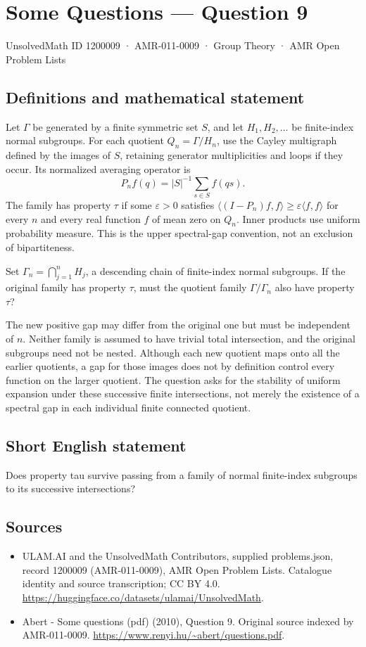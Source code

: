 \documentclass[11pt,a4paper]{article}
\begin{document}
\section*{Some Questions — Question 9}\label{1200009}
{\small UnsolvedMath ID 1200009 · AMR-011-0009 · Group Theory · AMR Open Problem Lists}
\subsection{Definitions and mathematical statement}
Let $\Gamma$ be generated by a finite symmetric set $S$, and let $H_1,H_2,\ldots$ be finite-index normal subgroups. For each quotient $Q_n=\Gamma/H_n$, use the Cayley multigraph defined by the images of $S$, retaining generator multiplicities and loops if they occur. Its normalized averaging operator is
\[
 P_n f(q)=|S|^{-1}\sum_{s\in S}f(qs).
\]
The family has property $\tau$ if some $\varepsilon>0$ satisfies
$\langle(I-P_n)f,f\rangle\geq\varepsilon\langle f,f\rangle$ for every $n$ and every real function $f$ of mean zero on $Q_n$. Inner products use uniform probability measure. This is the upper spectral-gap convention, not an exclusion of bipartiteness.

Set $\Gamma_n=\bigcap_{j=1}^nH_j$, a descending chain of finite-index normal subgroups. If the original family has property $\tau$, must the quotient family $\Gamma/\Gamma_n$ also have property $\tau$?

The new positive gap may differ from the original one but must be independent of $n$. Neither family is assumed to have trivial total intersection, and the original subgroups need not be nested. Although each new quotient maps onto all the earlier quotients, a gap for those images does not by definition control every function on the larger quotient. The question asks for the stability of uniform expansion under these successive finite intersections, not merely the existence of a spectral gap in each individual finite connected quotient.
\subsection{Short English statement}
Does property tau survive passing from a family of normal finite-index subgroups to its successive intersections?
\subsection{Sources}
\begin{itemize}
\item[S1] ULAM.AI and the UnsolvedMath Contributors, supplied problems.json, record 1200009 (AMR-011-0009), AMR Open Problem Lists. Catalogue identity and source transcription; CC BY 4.0.
\url{https://huggingface.co/datasets/ulamai/UnsolvedMath}.
\item[S2] Abert - Some questions (pdf) (2010), Question 9. Original source indexed by AMR-011-0009.
\url{https://www.renyi.hu/~abert/questions.pdf}.
\end{itemize}
\end{document}
